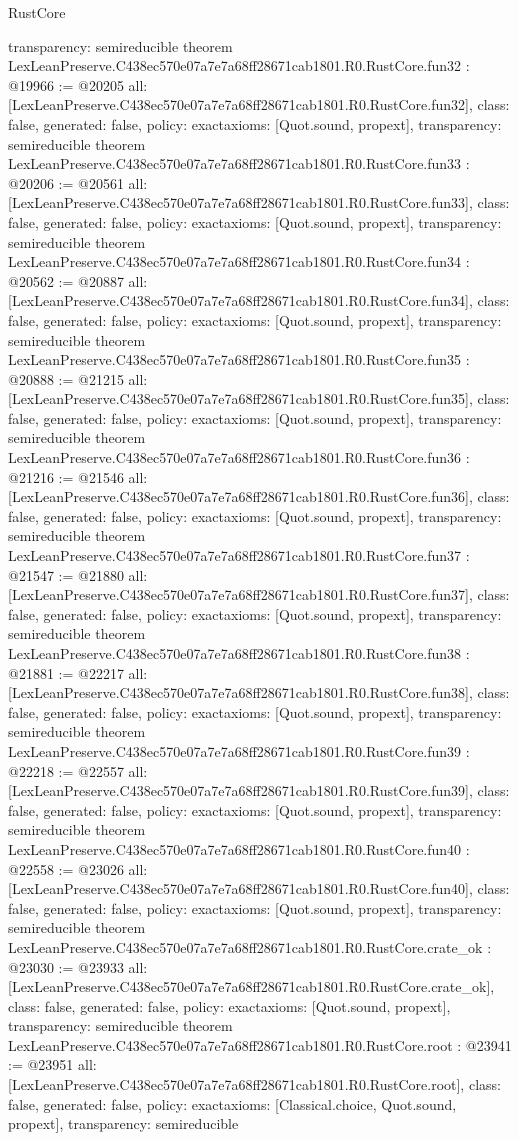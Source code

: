 \begin{lexlean}{RustCore}
\begin{coremodule}
{  transparency: semireducible
}
theorem LexLeanPreserve.C438ec570e07a7e7a68ff28671cab1801.R0.RustCore.fun32 : @19966 := @20205 {
  all: [LexLeanPreserve.C438ec570e07a7e7a68ff28671cab1801.R0.RustCore.fun32],
  class: false,
  generated: false,
  policy: exact{axioms: [Quot.sound, propext]},
  transparency: semireducible
}
theorem LexLeanPreserve.C438ec570e07a7e7a68ff28671cab1801.R0.RustCore.fun33 : @20206 := @20561 {
  all: [LexLeanPreserve.C438ec570e07a7e7a68ff28671cab1801.R0.RustCore.fun33],
  class: false,
  generated: false,
  policy: exact{axioms: [Quot.sound, propext]},
  transparency: semireducible
}
theorem LexLeanPreserve.C438ec570e07a7e7a68ff28671cab1801.R0.RustCore.fun34 : @20562 := @20887 {
  all: [LexLeanPreserve.C438ec570e07a7e7a68ff28671cab1801.R0.RustCore.fun34],
  class: false,
  generated: false,
  policy: exact{axioms: [Quot.sound, propext]},
  transparency: semireducible
}
theorem LexLeanPreserve.C438ec570e07a7e7a68ff28671cab1801.R0.RustCore.fun35 : @20888 := @21215 {
  all: [LexLeanPreserve.C438ec570e07a7e7a68ff28671cab1801.R0.RustCore.fun35],
  class: false,
  generated: false,
  policy: exact{axioms: [Quot.sound, propext]},
  transparency: semireducible
}
theorem LexLeanPreserve.C438ec570e07a7e7a68ff28671cab1801.R0.RustCore.fun36 : @21216 := @21546 {
  all: [LexLeanPreserve.C438ec570e07a7e7a68ff28671cab1801.R0.RustCore.fun36],
  class: false,
  generated: false,
  policy: exact{axioms: [Quot.sound, propext]},
  transparency: semireducible
}
theorem LexLeanPreserve.C438ec570e07a7e7a68ff28671cab1801.R0.RustCore.fun37 : @21547 := @21880 {
  all: [LexLeanPreserve.C438ec570e07a7e7a68ff28671cab1801.R0.RustCore.fun37],
  class: false,
  generated: false,
  policy: exact{axioms: [Quot.sound, propext]},
  transparency: semireducible
}
theorem LexLeanPreserve.C438ec570e07a7e7a68ff28671cab1801.R0.RustCore.fun38 : @21881 := @22217 {
  all: [LexLeanPreserve.C438ec570e07a7e7a68ff28671cab1801.R0.RustCore.fun38],
  class: false,
  generated: false,
  policy: exact{axioms: [Quot.sound, propext]},
  transparency: semireducible
}
theorem LexLeanPreserve.C438ec570e07a7e7a68ff28671cab1801.R0.RustCore.fun39 : @22218 := @22557 {
  all: [LexLeanPreserve.C438ec570e07a7e7a68ff28671cab1801.R0.RustCore.fun39],
  class: false,
  generated: false,
  policy: exact{axioms: [Quot.sound, propext]},
  transparency: semireducible
}
theorem LexLeanPreserve.C438ec570e07a7e7a68ff28671cab1801.R0.RustCore.fun40 : @22558 := @23026 {
  all: [LexLeanPreserve.C438ec570e07a7e7a68ff28671cab1801.R0.RustCore.fun40],
  class: false,
  generated: false,
  policy: exact{axioms: [Quot.sound, propext]},
  transparency: semireducible
}
theorem LexLeanPreserve.C438ec570e07a7e7a68ff28671cab1801.R0.RustCore.crate_ok : @23030 := @23933 {
  all: [LexLeanPreserve.C438ec570e07a7e7a68ff28671cab1801.R0.RustCore.crate_ok],
  class: false,
  generated: false,
  policy: exact{axioms: [Quot.sound, propext]},
  transparency: semireducible
}
theorem LexLeanPreserve.C438ec570e07a7e7a68ff28671cab1801.R0.RustCore.root : @23941 := @23951 {
  all: [LexLeanPreserve.C438ec570e07a7e7a68ff28671cab1801.R0.RustCore.root],
  class: false,
  generated: false,
  policy: exact{axioms: [Classical.choice, Quot.sound, propext]},
  transparency: semireducible
}


\end{coremodule}
\end{lexlean}
